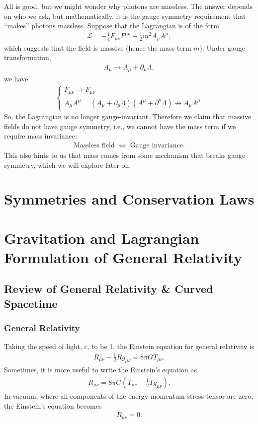 \documentclass[a4paper,11pt]{article}
\numberwithin{equation}{section}
\theoremstyle{definition}
\newcommand{\p}{\partial}
\newcommand{\lag}{\mathcal{L}}
\begin{document}
All is good, but we might wonder why photons are massless. The answer depends on who we ask, but mathematically, it is the gauge symmetry requirement that ``makes'' photons massless. Suppose that the Lagrangian is of the form
\begin{align*}
\lag = -\frac{1}{4}F_{\mu\nu}F^{\mu\nu}+ \frac{1}{2}m^2A_\mu A^\mu,
\end{align*}
which suggests that the field is massive (hence the mass term $m$). Under gauge transformation,
\begin{align*}
A_\mu \rightarrow A_\mu + \p_\mu \Lambda,
\end{align*}
we have 
\begin{align*}
\begin{cases}
F_{\mu\nu} \rightarrow F_{\mu\nu}\\
A_\mu A^\mu = (A_\mu + \p_\mu\Lambda)(A^\mu + \p^\mu\Lambda) \not\to A_\mu A^\mu
\end{cases}
\end{align*}
So, the Lagrangian is no longer gauge-invariant. Therefore we claim that massive fields do not have gauge symmetry, i.e., we cannot have the mass term if we require mass invariance:
\begin{align*}
\text{Massless field }\iff \text{ Gauge invariance}.
\end{align*}
This also hints to us that mass comes from some mechanism that breaks gauge symmetry, which we will explore later on. 

\newpage

\section{Symmetries and Conservation Laws}

\newpage

\section{Gravitation and Lagrangian Formulation of General Relativity}

\subsection{Review of General Relativity \& Curved Spacetime}

\subsubsection{General Relativity}
Taking the speed of light, $c$, to be 1, the Einstein equation for general relativity is
\begin{align*}
R_{\mu\nu} - \frac{1}{2}Rg_{\mu\nu} = 8\pi GT_{\mu\nu}.
\end{align*}
Sometimes, it is more useful to write the Einstein's equation as
\begin{align*}
R_{\mu\nu} = 8\pi G \left( T_{\mu\nu} - \frac{1}{2}Tg_{\mu\nu} \right).
\end{align*}
In vacuum, where all components of the energy-momentum stress tensor are zero, the Einstein's equation becomes
\begin{align*}
R_{\mu\nu} = 0.
\end{align*}
\end{document}
